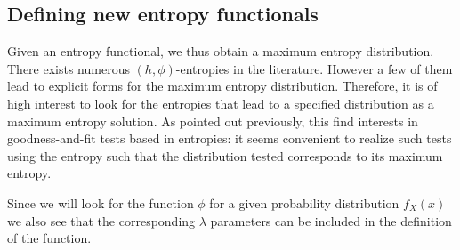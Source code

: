 \documentclass[english]{elsarticle}
\theoremstyle{definition}
\theoremstyle{plain}
\theoremstyle{plain}
\begin{document}

\subsection{Defining new entropy functionals}

\label{subsec:NewPhiEnt}

Given an entropy functional, we thus obtain a maximum entropy distribution.
There exists numerous $(h,\phi)$-entropies in the literature. However
a few of them lead to explicit forms for the maximum entropy distribution.
Therefore, it is of high interest to look for the entropies that lead
to a specified distribution as a maximum entropy solution. As pointed
out previously, this find interests in goodness-and-fit tests based
in entropies: it seems convenient to realize such tests using the
entropy such that the distribution tested corresponds to its maximum
entropy.

Since we will look for the  function $\phi$ for a given probability distribution
$f_X(x)$ we also see that the corresponding $\lambda$ parameters can be included
in the definition of the function.
\end{document}
